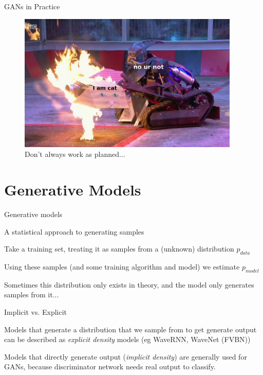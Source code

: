 \documentclass[10pt]{beamer}
\begin{document}
\begin{frame}{GANs in Practice}

\begin{figure}
    \centering
    \includegraphics[width=0.94\textwidth]{figures/robot-wars.jpg}
    \caption*{Don't always work as planned...}
    \label{fig:robot-wars}
\end{figure}{}
\end{frame}{}

\section{Generative Models}

\begin{frame}{Generative models}

A statistical approach to generating samples

Take a training set, treating it as samples from a (unknown) distribution $p_{data}$

Using these samples (and some training algorithm and model) we estimate $p_{model}$

Sometimes this distribution only exists in theory, and the model only generates samples from it...

\end{frame}

\begin{frame}{Implicit vs. Explicit}

Models that generate a distribution that we sample from to get generate output can be described as \emph{explicit density} \cite{neurips} models (eg WaveRNN, WaveNet (FVBN))

Models that directly generate output (\emph{implicit density}) are generally used for GANs, because discriminator network needs real output to classify.

\end{frame}
\end{document}
